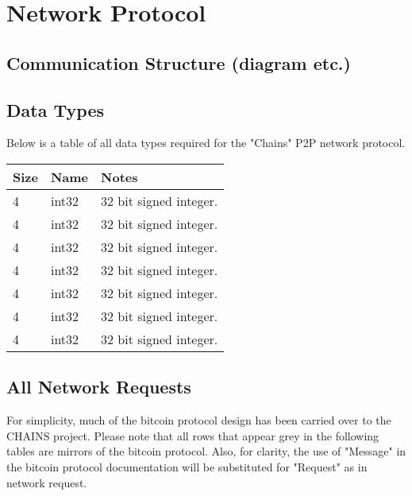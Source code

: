 \documentclass{article}
\begin{document}
\section{Network Protocol}
\subsection{Communication Structure (diagram etc.)}
\subsection{Data Types}
Below is a table of all data types required for the "Chains" P2P network protocol.

\begin{center}
\begin{tabular}{ ||l|l|l|| }
\hline
 Size & Name & Notes \\ 
\hline\hline
 4 & int32 & 32 bit signed integer. \\  
 4 & int32 & 32 bit signed integer. \\  
 4 & int32 & 32 bit signed integer. \\  
 4 & int32 & 32 bit signed integer. \\  
 4 & int32 & 32 bit signed integer. \\  
 4 & int32 & 32 bit signed integer. \\  
 4 & int32 & 32 bit signed integer. \\  
\hline
\end{tabular}
\end{center}

\subsection{All Network Requests}
For simplicity, much of the bitcoin protocol design has been carried over to the CHAINS project.
Please note that all rows that appear grey in the following tables are mirrors of the bitcoin protocol.
Also, for clarity, the use of "Message" in the bitcoin protocol documentation will be substituted for "Request" as in network request.
\end{document}

